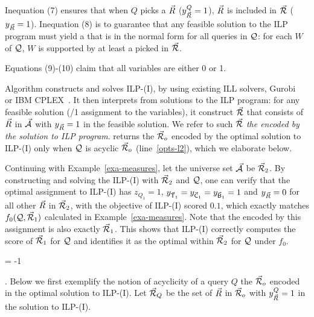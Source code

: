\vspace{0.6ex}
Inequation (7) ensures that when $Q$ picks a \bs $\vec{R}$
($y_{\vec{R}}^{Q} = 1$), $\vec{R}$ is included in \bds $\vec{{\mathcal R}}$
($y_{\vec{R}} = 1$).
%
Inequation (8) is to guarantee that any feasible solution to the
ILP program must yield a \bds that is in the normal form for all
queries in $\mathcal Q$: for each \qcs $W$ of $\mathcal Q$, $W$ is supported by
at least a \bs picked in $\vec{{\mathcal R}}$.

\vspace{0.6ex}
Equations (9)-(10) claim that all variables are either 0 or 1.


\vspace{1.6ex}
Algorithm \opts constructs and solves ILP-(I), 
by using existing ILL solvers, \eg Gurobi~\cite{gurobi} or
IBM CPLEX~\cite{cplex}.
%
It then interprets \bdss from solutions to the ILP
program: for any feasible solution (/1 assignment to the
variables), it construct \bds $\vec{{\mathcal R}}$ that consists of \bss
$\vec{R}$ in $\vec{{\mathcal A}}$ with $y_{\vec{R}}  = 1$ in the feasible
solution. We refer to such $\vec{{\mathcal R}}$ {\em the \bds encoded by the
solution to ILP program}. \opts returns the \bds
$\vec{{\mathcal R}}_{o}$ encoded by the optimal solution to ILP-(I) only
when $\mathcal Q$ is acyclic \wrt $\vec{{\mathcal R}}_{o}$ (line~\ref{opts-l2}), which we elaborate below. 


\begin{example}\label{exa-ILP-I}
Continuing with Example~\ref{exa-measures},
let the universe set $\vec{{\mathcal A}}$ be $\vec{{\mathcal R}}_{2}$.
By constructing and solving the ILP-(I) with $\vec{{\mathcal R}}_{2}$ and $\mathcal Q$,
one can verify that the optimal assignment to ILP-(I) has
$z_{Q_{1}} = 1$, $y_{\vec{\protect\mathsf{T}}_{1}} = y_{\vec{\protect\mathsf{C}}_{1}} =
y_{\vec{\protect\mathsf{B}}_{1}} = 1$ and $y_{\vec{R}} = 0$ for all other
$\vec{R}$ in $\vec{{\mathcal R}}_{2}$, with the objective of ILP-(I) scored $0.1$, which
exactly matches $f_{0}(\mathcal Q, \vec{{\mathcal R}}_{1})$ calculated in Example~\ref{exa-measures}.
Note that the encoded \bds by this assignment is also exactly
$\vec{{\mathcal R}}_{1}$. This shows that ILP-(I) correctly computes the
score of $\vec{{\mathcal R}}_{1}$ for $\mathcal Q$ and identifies it as the optimal
\bds within $\vec{{\mathcal R}}_{2}$ for $\mathcal Q$ under $f_{0}$. 
\end{example}
\looseness = -1


. Below we
first exemplify the notion
of acyclicity of a query $Q$ \wrt the \bds $\vec{{\mathcal R}}_{o}$ encoded
in the optimal solution to ILP-(I). Let $\vec{{\mathcal R}}_{Q}$ be the set
of \bss $\vec{R}$ in $\vec{{\mathcal R}}_{o}$ with $y_{\vec{R}}^{Q} = 1$ in
the solution to ILP-(I).


